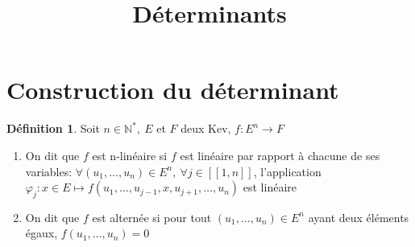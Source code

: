 \documentclass[fleqn]{article}
\title{D\'eterminants}
\date{}
\theoremstyle{definition} \newtheorem*{defi}{D\'efinition}
\theoremstyle{definition} \newtheorem*{theo}{Th\'eor\`eme}
\theoremstyle{definition} \newtheorem*{coro}{Corollaire}
\theoremstyle{definition} \newtheorem*{nota}{Notation}
\theoremstyle{definition} \newtheorem*{vocab}{Vocabulaire}
\theoremstyle{remark} \newtheorem*{rqs}{Remarques}
\theoremstyle{definition} \newtheorem*{prop}{Propri\'et\'e}
\begin{document}
\maketitle

\section{Construction du d\'eterminant}
\begin{defi}
	Soit $n \in \mathbb{N}^*,\ E$ et $F$ deux Kev, $f: E^n \rightarrow F$
	\begin{enumerate}
		\item On dit que $f$ est n-lin\'eaire si $f$ est lin\'eaire par rapport \`a chacune de ses variables:
		$\forall (u_1, \hdots, u_n) \in E^n,\ \forall j \in [\![1,n]\!]$, l'application $\varphi_j: x \in E \mapsto f(u_1, \hdots, u_{j-1},
		x, u_{j+1}, \hdots, u_n)$ est lin\'eaire
		\item On dit que $f$ est altern\'ee si pour tout $(u_1, \hdots, u_n) \in E^n$ ayant deux \'el\'ements \'egaux, $f(u_1, \hdots, u_n) = 0$
	\end{enumerate}
\end{defi}
\end{document}
